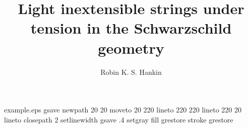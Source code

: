 %
%
%
%
%
\begin{filecontents*}{example.eps}
gsave
newpath
  20 20 moveto
  20 220 lineto
  220 220 lineto
  220 20 lineto
closepath
2 setlinewidth
gsave
  .4 setgray fill
grestore
stroke
grestore
\end{filecontents*}
%
\RequirePackage{fix-cm}
%
\documentclass[smallextended]{svjour3}       %
%
\smartqed  %
%
\usepackage{graphicx}
\usepackage{amssymb}
%
%
%
%
%


\title{Light inextensible strings under tension in the Schwarzschild geometry}%



\author{Robin K. S. Hankin}


